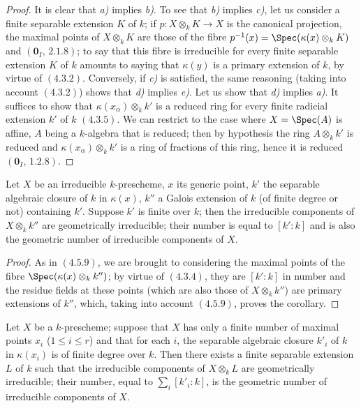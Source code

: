 \begin{proof}
It is clear that \emph{a)} implies \emph{b)}.
To see that \emph{b)} implies \emph{c)}, let us consider a finite separable extension $K$ of $k$; if $p:X\otimes_k K\to X$ is the canonical projection, the maximal points of $X\otimes_k K$ are those of the fibre $p^{-1}(x)=\Spec(\kappa(x)\otimes_k K)$  and $(\mathbf{0}_I,\,2.1.8)$; to say that this fibre is irreducible for every finite separable extension $K$ of $k$ amounts to saying that $\kappa(y)$ is a primary extension of $k$, by virtue of $(4.3.2)$.
Conversely, if \emph{c)} is satisfied, the same reasoning (taking into account $(4.3.2)$) shows that \emph{d)} implies \emph{e)}.
Let us show that \emph{d)} implies \emph{a)}.
It suffices to show that $\kappa(x_\alpha)\otimes_k k'$ is a reduced ring for every finite radicial extension $k'$ of $k$ $(4.3.5)$.
We can restrict to the case where $X=\Spec(A)$ is affine, $A$ being a $k$-algebra that is reduced; then by hypothesis the ring $A\otimes_k k'$ is reduced  and $\kappa(x_\alpha)\otimes_k k'$ is a ring of fractions of this ring, hence it is reduced $(\mathbf{0}_I,\,1.2.8)$.
\end{proof}


\begin{corollary}[4.5.10]
\label{IV.4.5.10}
Let $X$ be an irreducible $k$-prescheme, $x$ its generic point, $k'$ the separable algebraic closure of $k$ in $\kappa(x)$, $k''$ a Galois extension of $k$ (of finite degree or not) containing $k'$.
Suppose $k'$ is finite over $k$; then the irreducible components of $X\otimes_k k''$ are geometrically irreducible; their number is equal to $[k':k]$ and is also the geometric number of irreducible components of $X$.
\end{corollary}

\begin{proof}
As in $(4.5.9)$, we are brought to considering the maximal points of the fibre $\Spec(\kappa(x)\otimes_k k'')$; by virtue of $(4.3.4)$, they are $[k':k]$ in number and the residue fields at these points (which are also those of $X\otimes_k k''$) are primary extensions of $k''$, which, taking into account $(4.5.9)$, proves the corollary.
\end{proof}

\begin{corollary}[4.5.11]
\label{IV.4.5.11}
Let $X$ be a $k$-prescheme; suppose that $X$ has only a finite number of maximal points $x_i$ ($1\leq i\leq r$) and that for each $i$, the separable algebraic closure $k'_i$ of $k$ in $\kappa(x_i)$ is of finite degree over $k$.
Then there exists a finite separable extension $L$ of $k$ such that the irreducible components of $X\otimes_k L$ are geometrically irreducible; their number, equal to $\sum_i [k'_i:k]$, is the geometric number of irreducible components of $X$.
\end{corollary}


